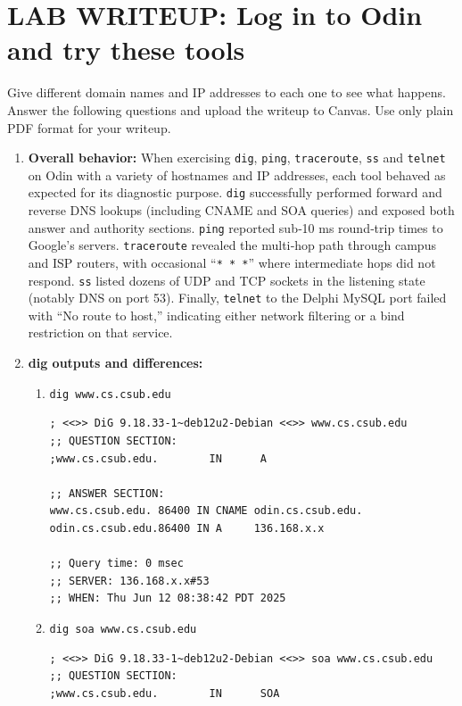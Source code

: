 \documentclass[12pt]{article}
\begin{document}
\section*{LAB WRITEUP: Log in to Odin and try these tools}
Give different domain names and IP addresses to each one to see what happens. Answer the following questions and upload the writeup to Canvas. Use only plain PDF format for your writeup.

\begin{enumerate}

\item \textbf{Overall behavior:}  
When exercising \texttt{dig}, \texttt{ping}, \texttt{traceroute}, \texttt{ss} and \texttt{telnet} on Odin with a variety of hostnames and IP addresses, each tool behaved as expected for its diagnostic purpose. \texttt{dig} successfully performed forward and reverse DNS lookups (including CNAME and SOA queries) and exposed both answer and authority sections. \texttt{ping} reported sub‐10 ms round‐trip times to Google’s servers. \texttt{traceroute} revealed the multi‐hop path through campus and ISP routers, with occasional “\texttt{* * *}” where intermediate hops did not respond. \texttt{ss} listed dozens of UDP and TCP sockets in the listening state (notably DNS on port 53). Finally, \texttt{telnet} to the Delphi MySQL port failed with “No route to host,” indicating either network filtering or a bind restriction on that service.

\item \textbf{dig outputs and differences:}  
  \begin{enumerate}
  \item \texttt{dig www.cs.csub.edu}
  \begin{lstlisting}[caption={Output of \texttt{dig www.cs.csub.edu}}]
; <<>> DiG 9.18.33-1~deb12u2-Debian <<>> www.cs.csub.edu
;; QUESTION SECTION:
;www.cs.csub.edu.        IN      A

;; ANSWER SECTION:
www.cs.csub.edu. 86400 IN CNAME odin.cs.csub.edu.
odin.cs.csub.edu.86400 IN A     136.168.x.x

;; Query time: 0 msec
;; SERVER: 136.168.x.x#53
;; WHEN: Thu Jun 12 08:38:42 PDT 2025
  \end{lstlisting}

  \item \texttt{dig soa www.cs.csub.edu}
  \begin{lstlisting}[caption={Output of \texttt{dig soa www.cs.csub.edu}}]
; <<>> DiG 9.18.33-1~deb12u2-Debian <<>> soa www.cs.csub.edu
;; QUESTION SECTION:
;www.cs.csub.edu.        IN      SOA


\end{lstlisting}
\end{enumerate}
\end{enumerate}
\end{document}
